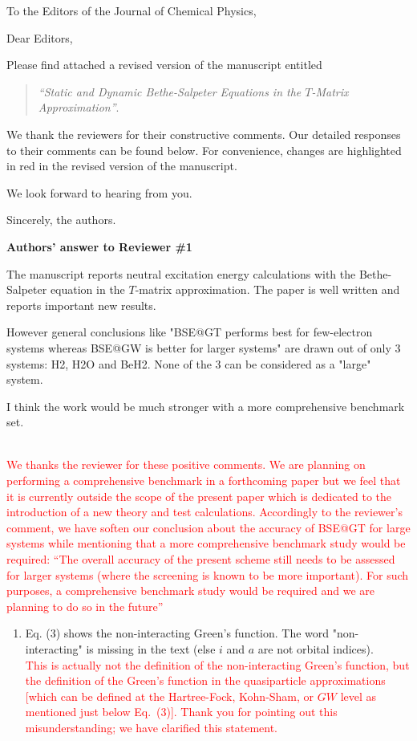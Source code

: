 \documentclass[10pt]{letter}
\newcommand{\alert}[1]{\textcolor{red}{#1}}
\begin{document}
\begin{letter}%
{To the Editors of the Journal of Chemical Physics,}

\opening{Dear Editors,}

\justifying
Please find attached a revised version of the manuscript entitled 
\begin{quote}
	\textit{``Static and Dynamic Bethe-Salpeter Equations in the $T$-Matrix Approximation''}.
\end{quote}
We thank the reviewers for their constructive comments.
Our detailed responses to their comments can be found below.
For convenience, changes are highlighted in red in the revised version of the manuscript. 

We look forward to hearing from you.

\closing{Sincerely, the authors.}

\newpage

\noindent \textbf{\large Authors' answer to Reviewer \#1}
 
{The manuscript reports neutral excitation energy calculations with the Bethe-Salpeter equation in the $T$-matrix approximation. 
The paper is well written and reports important new results. 

However general conclusions like "BSE@GT performs best for few-electron systems whereas BSE@GW is better for larger systems" 
are drawn out of only 3 systems: H2, H2O and BeH2. None of the 3 can be considered as a "large" system. 

I think the work would be much stronger with a more comprehensive benchmark set.}
\\
\alert{
We thanks the reviewer for these positive comments.
We are planning on performing a comprehensive benchmark in a forthcoming paper but we feel that it is currently outside the scope of the present paper which is dedicated to the introduction of a new theory and test calculations.
Accordingly to the reviewer's comment, we have soften our conclusion about the accuracy of BSE@GT for large systems while mentioning that a more comprehensive benchmark study would be required:
``The overall accuracy of the present scheme still needs to be assessed for larger systems (where the screening is known to be more important). 
For such purposes, a comprehensive benchmark study would be required and we are planning to do so in the future''
}

\begin{enumerate}

\item 
{Eq. (3) shows the non-interacting Green's function. 
The word "non-interacting" is missing in the text (else $i$ and $a$ are not orbital indices). }
\\
\alert{
This is actually not the definition of the non-interacting Green's function, but the definition of the Green's function in the quasiparticle approximations [which can be defined at the Hartree-Fock, Kohn-Sham, or $GW$ level as mentioned just below Eq.~(3)].
Thank you for pointing out this misunderstanding; we have clarified this statement.
}


\end{enumerate}
\end{letter}
\end{document}

